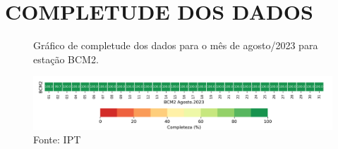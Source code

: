 \section{COMPLETUDE DOS DADOS}

\begin{figure}[htb!]
    \centering
	\captionsetup{justification=raggedright, singlelinecheck=false, width=1\textwidth}
    \caption{Gráfico de completude dos dados para o mês de agosto/2023 para estação BCM2.}
    \includegraphics[width=1.0\textwidth]{./boletim/main/figuras/completude.png} %
    \caption*{Fonte: IPT}
    \label{fig:completude}
\end{figure}

